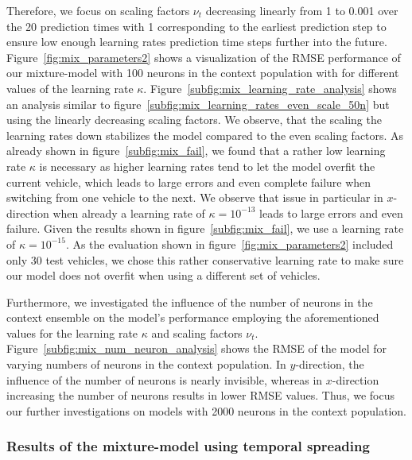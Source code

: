Therefore, we focus on scaling factors $\nu_t$ decreasing linearly from \num{1} to \num{0.001} over the \num{20} prediction times with \num{1} corresponding to the earliest prediction step to ensure low enough learning rates prediction time steps further into the future.
Figure~\ref{fig:mix_parameters2} shows a visualization of the \ac{RMSE} performance of our mixture-model with \num{100} neurons in the context population with for different values of the learning rate $\kappa$.
Figure~\ref{subfig:mix_learning_rate_analysis} shows an analysis similar to figure~\ref{subfig:mix_learning_rates_even_scale_50n} but using the linearly decreasing scaling factors.
We observe, that the scaling the learning rates down stabilizes the model compared to the even scaling factors.
As already shown in figure~\ref{subfig:mix_fail}, we found that a rather low learning rate $\kappa$ is necessary as higher learning rates tend to let the model overfit the current vehicle, which leads to large errors and even complete failure when switching from one vehicle to the next.
We observe that issue in particular in $x$-direction when already a learning rate of $\kappa = 10^{-13}$ leads to large errors and even failure.
Given the results shown in figure~\ref{subfig:mix_fail}, we use a learning rate of $\kappa=10^{-15}$.
As the evaluation shown in figure~\ref{fig:mix_parameters2} included only \num{30} test vehicles, we chose this rather conservative learning rate to make sure our model does not overfit when using a different set of vehicles.

Furthermore, we investigated the influence of the number of neurons in the context ensemble on the model's performance employing the aforementioned values for the learning rate $\kappa$ and scaling factors $\nu_{t}$.
Figure~\ref{subfig:mix_num_neuron_analysis} shows the \ac{RMSE} of the model for varying numbers of neurons in the context population. 
In $y$-direction, the influence of the number of neurons is nearly invisible, whereas in $x$-direction increasing the number of neurons results in lower \ac{RMSE} values.
Thus, we focus our further investigations on models with \num{2000} neurons in the context population.

\subsubsection{Results of the mixture-model using temporal spreading}%
\label{ssubsec:results_of_the_mixture_model_using_temporal_spreading}


